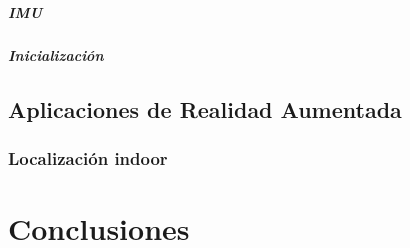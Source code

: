 \documentclass[a4paper, 12pt]{book}
\begin{document}
\paragraph{IMU}
\label{subsec:imu}

\paragraph{Inicialización}
\label{subsec:inicializacion}

\section{Aplicaciones de Realidad Aumentada}
\label{sec:aplicacionesdesarrolladas}

\subsection{Localización indoor}
\label{sec:localizacionindoor}

\chapter{Conclusiones}
\label{sec:conclusiones}

\cleardoublepage

%
%  
\end{document}

